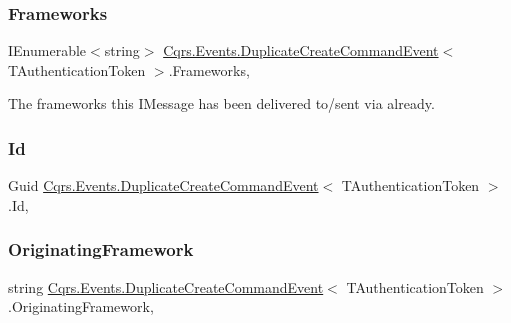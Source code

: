 \subsubsection{\texorpdfstring{Frameworks}{Frameworks}}
{\footnotesize\ttfamily I\+Enumerable$<$string$>$ \hyperlink{classCqrs_1_1Events_1_1DuplicateCreateCommandEvent}{Cqrs.\+Events.\+Duplicate\+Create\+Command\+Event}$<$ T\+Authentication\+Token $>$.Frameworks\hspace{0.3cm}{\ttfamily [get]}, {\ttfamily [set]}}



The frameworks this I\+Message has been delivered to/sent via already. 

\mbox{\label{classCqrs_1_1Events_1_1DuplicateCreateCommandEvent_a6b837c04369ac127fc34f84799c3d70a}} 
\subsubsection{\texorpdfstring{Id}{Id}}
{\footnotesize\ttfamily Guid \hyperlink{classCqrs_1_1Events_1_1DuplicateCreateCommandEvent}{Cqrs.\+Events.\+Duplicate\+Create\+Command\+Event}$<$ T\+Authentication\+Token $>$.Id\hspace{0.3cm}{\ttfamily [get]}, {\ttfamily [set]}}

\mbox{\label{classCqrs_1_1Events_1_1DuplicateCreateCommandEvent_a9f3b0ffe268a9be9895009b3f8894727}} 
\subsubsection{\texorpdfstring{Originating\+Framework}{OriginatingFramework}}
{\footnotesize\ttfamily string \hyperlink{classCqrs_1_1Events_1_1DuplicateCreateCommandEvent}{Cqrs.\+Events.\+Duplicate\+Create\+Command\+Event}$<$ T\+Authentication\+Token $>$.Originating\+Framework\hspace{0.3cm}{\ttfamily [get]}, {\ttfamily [set]}}




